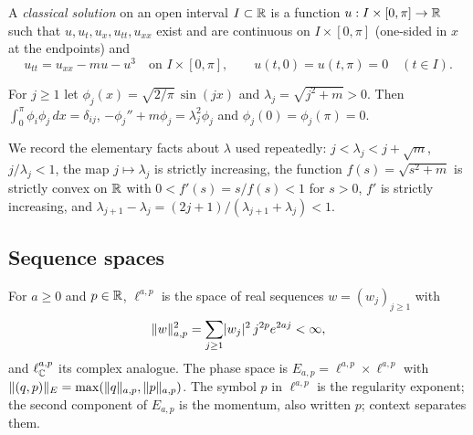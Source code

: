 \begin{definition}\label{bpW:w0:nlw}
A \emph{classical solution} on an open interval $I\subset\mathbb{R}$ is a function $u:I\times[0,\pi]\to\mathbb{R}$ such that
$u,u_t,u_x,u_{tt},u_{xx}$ exist and are continuous on $I\times[0,\pi]$ (one-sided in $x$ at the endpoints) and
\begin{equation}\label{bpW:w0:eq}
u_{tt}=u_{xx}-mu-u^3\quad\text{on }I\times[0,\pi],\qquad u(t,0)=u(t,\pi)=0\quad(t\in I).
\end{equation}
\end{definition}

\begin{definition}\label{bpW:w0:basis}
For $j\ge1$ let $\phi_j(x)=\sqrt{2/\pi}\,\sin(jx)$ and $\lambda_j=\sqrt{j^2+m}>0$. Then
$\int_0^\pi\phi_i\phi_j\,dx=\delta_{ij}$, $-\phi_j''+m\phi_j=\lambda_j^2\phi_j$ and $\phi_j(0)=\phi_j(\pi)=0$.
\end{definition}

We record the elementary facts about $\lambda$ used repeatedly: $j<\lambda_j<j+\sqrt m$, $j/\lambda_j<1$, the map
$j\mapsto\lambda_j$ is strictly increasing, the function $f(s)=\sqrt{s^2+m}$ is strictly convex on $\mathbb{R}$ with
$0<f'(s)=s/f(s)<1$ for $s>0$, $f'$ is strictly increasing, and $\lambda_{j+1}-\lambda_j=(2j+1)/(\lambda_{j+1}+\lambda_j)<1$.

\subsection{Sequence spaces}\label{bpW:w0:spaces}

\begin{definition}\label{bpW:w0:ellap}
For $a\ge0$ and $p\in\mathbb{R}$, $\ell^{a,p}$ is the space of real sequences $w=(w_j)_{j\ge1}$ with
\[\lVert w\rVert_{a,p}^2=\sum_{j\ge1}\lvert w_j\rvert^2\,j^{2p}e^{2aj}<\infty,\]
and $\ell^{a,p}_{\mathbb{C}}$ its complex analogue. The phase space is $E_{a,p}=\ell^{a,p}\times\ell^{a,p}$ with
$\lVert (q,p)\rVert_{E}=\max(\lVert q\rVert_{a,p},\lVert p\rVert_{a,p})$. The symbol $p$ in $\ell^{a,p}$ is the regularity exponent;
the second component of $E_{a,p}$ is the momentum, also written $p$; context separates them.
\end{definition}


